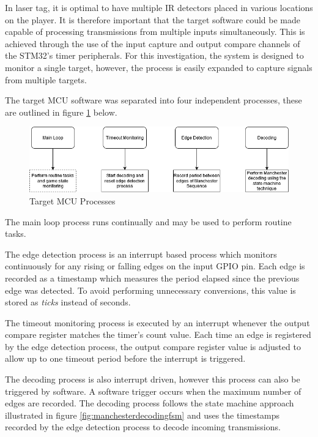 In laser tag, it is optimal to have multiple IR detectors placed in various locations on the player. It is therefore important that the target software could be made capable of processing transmissions from multiple inputs simultaneously. This is achieved through the use of the input capture and output compare channels of the STM32's timer peripherals. For this investigation, the system is designed to monitor a single target, however, the process is easily expanded to capture signals from multiple targets.

The target MCU software was separated into four independent processes, these are outlined in figure \ref{fig:target_software_overview} below.

\begin{figure}[H]
	\centering
	\includegraphics[width=0.8\linewidth]{figures/design/target_software_overview.png}
	\caption{Target MCU Processes}
	\label{fig:target_software_overview}
\end{figure}

The main loop process runs continually and may be used to perform routine tasks.

The edge detection process is an interrupt based process which monitors continuously for any rising or falling edges on the input GPIO pin. Each edge is recorded as a timestamp which measures the period elapsed since the previous edge was detected. To avoid performing unnecessary conversions, this value is stored as \textit{ticks} instead of seconds.

The timeout monitoring process is executed by an interrupt whenever the output compare register matches the timer's count value. Each time an edge is registered by the edge detection process, the output compare register value is adjusted to allow up to one timeout period before the interrupt is triggered.

The decoding process is also interrupt driven, however this process can also be triggered by software. A software trigger occurs when the maximum number of edges are recorded. The decoding process follows the state machine approach illustrated in figure \ref{fig:manchesterdecodingfsm} and uses the timestamps recorded by the edge detection process to decode incoming transmissions.

